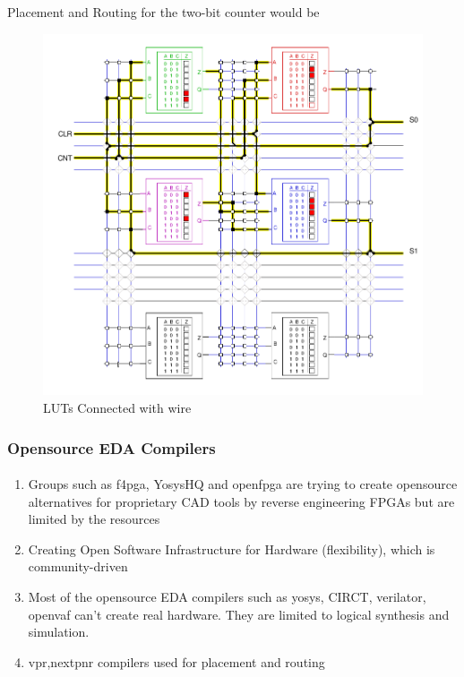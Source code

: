 \documentclass{beamer}
\begin{document}
{\begin{frame}[fragile]
  Placement and Routing for the two-bit counter would be 

  \begin{figure}
    \centering
    \includegraphics[width=0.5\linewidth]{images/fpga_luts.png}
    \caption{LUTs Connected with wire\cite{brown92}}
    \label{exa_interconnect}
  \end{figure}
\end{frame}


\begin{frame}[fragile]
  \frametitle{Opensource EDA Compilers}
  \framesubtitle{}
  \begin{enumerate}
    \item Groups such as f4pga, YosysHQ and openfpga are trying to create opensource
      alternatives for proprietary CAD tools by reverse engineering FPGAs
      but are limited by the resources 
    \item Creating Open Software Infrastructure for Hardware (flexibility),
      which is community-driven 
    \item Most of the opensource EDA compilers such as yosys, CIRCT, verilator,
      openvaf can't create real hardware. They are limited to
      logical synthesis and simulation.
     \item vpr\cite{vpr2},nextpnr\cite{nextpnr1} compilers used for placement and routing  
  \end{enumerate}
\end{frame}


}
\end{document}
